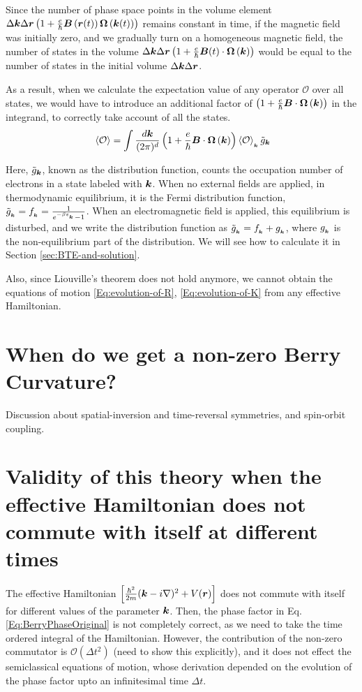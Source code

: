 \documentclass{report}
\renewcommand\vec[1]{\ensuremath\boldsymbol{#1}} %
\begin{document}
Since the number of phase space points in the volume element $\Delta \vec{k} \Delta \vec{r} \left(1 + \frac{e}{\hbar} \vec{B}\left(\vec{r}(t)\right) \vec{\Omega}\left(\vec{k}(t)\right)\right)$ remains constant in time, if the magnetic field was initially zero, and we gradually turn on a homogeneous magnetic field, the number of states in the volume $\Delta \vec{k} \Delta \vec{r} \left(1 + \frac{e}{\hbar} \vec{B}(t) \cdot \vec{\Omega}\left(\vec{k}\right)\right)$ would be equal to the number of states in the initial volume $\Delta \vec{k} \Delta \vec{r}$.

As a result, when we calculate the expectation value of any operator $\mathcal{O}$ over all states, we would have to introduce an additional factor of $\left(1 + \frac{e}{\hbar} \vec{B} \cdot \vec{\Omega}\left(\vec{k}\right)\right)$ in the integrand, to correctly take account of all the states.
\begin{equation}~\label{Eq:operator}
\expval{\mathcal{O}} = \int \frac{d\vec{k}}{(2\pi)^d} \left(1 + \frac{e}{\hbar} \vec{B} \cdot  \vec{\Omega}\left(\vec{k}\right)\right) \expval{\mathcal{O}}_{_{\vec{k}}} \tilde{g}_{\vec{k}}
\end{equation}

Here, $\tilde{g}_{\vec{k}}$, known as the distribution function, counts the occupation number of electrons in a state labeled with $\vec{k}$. When no external fields are applied, in thermodynamic equilibrium, it is the Fermi distribution function, $\tilde{g}_{_{\vec{k}}} = f_{_{\vec{k}}} = \frac{1}{e^{-\beta \varepsilon_{_{\vec{k}}}} - 1}$. When an electromagnetic field is applied, this equilibrium is disturbed, and we write the distribution function as $\tilde{g}_{_{\vec{k}}} = f_{_{\vec{k}}} + g_{_{\vec{k}}}$, where $g_{_{\vec{k}}}$ is the non-equilibrium part of the distribution. We will see how to calculate it in Section \ref{sec:BTE-and-solution}.

Also, since Liouville's theorem does not hold anymore, we cannot obtain the equations of motion \eqref{Eq:evolution-of-R}, \eqref{Eq:evolution-of-K} from any effective Hamiltonian.
\chapter{When do we get a non-zero Berry Curvature?}
Discussion about spatial-inversion and time-reversal symmetries, and spin-orbit coupling.
\chapter{Validity of this theory when the effective Hamiltonian does not commute with itself at different times}
The effective Hamiltonian $\left[\frac{\hbar^2}{2m}(\vec{k} - i \nabla)^2 + V(\vec{r}) \right]$ does not commute with itself for different values of the parameter $\vec{k}$. Then, the phase factor in Eq. \eqref{Eq:BerryPhaseOriginal} is not completely correct, as we need to take the time ordered integral of the Hamiltonian. However, the contribution of the non-zero commutator is $\mathcal{O} \left(\Delta{t}^2\right)$ (need to show this explicitly), and it does not effect the semiclassical equations of motion, whose derivation depended on the evolution of the phase factor upto an infinitesimal time $\Delta t$.
\end{document}
